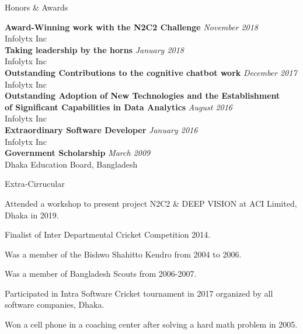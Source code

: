 \documentclass{resume} %
\begin{document}

\begin{rSection}{Honors \& Awards}

{\bf Award-Winning work with the N2C2 Challenge} \hfill {\em November 2018} 
\\ \hfill { Infolytx Inc }
\\
{\bf Taking leadership by the horns} \hfill {\em January 2018} 
\\ \hfill { Infolytx Inc }
\\
{\bf Outstanding Contributions to the cognitive chatbot work} \hfill {\em December 2017} 
\\ \hfill { Infolytx Inc }
\\
{\bf Outstanding Adoption of New Technologies and the Establishment\\ of Significant Capabilities in Data Analytics} \hfill {\em August 2016} 
\\ \hfill { Infolytx Inc }
\\
{\bf Extraordinary Software Developer} \hfill {\em January 2016} 
\\ \hfill { Infolytx Inc }
\\
{\bf Government Scholarship} \hfill {\em March 2009} 
\\ \hfill { Dhaka Education Board, Bangladesh }
\end{rSection}


\begin{rSection}{Extra-Cirrucular} \itemsep -3pt
\item Attended a workshop to present project N2C2 \& DEEP VISION at ACI Limited, Dhaka in 2019.
\item Finalist of Inter Departmental Cricket Competition 2014.
\item Was a member of the Bishwo Shahitto Kendro from 2004 to 2006.
\item Was a member of Bangladesh Scouts from 2006-2007.
\item  Participated in Intra Software Cricket tournament in 2017 organized by all software companies, Dhaka.
\item Won a cell phone in a coaching center after solving a hard math problem in 2005.


\end{rSection}
\end{document}
